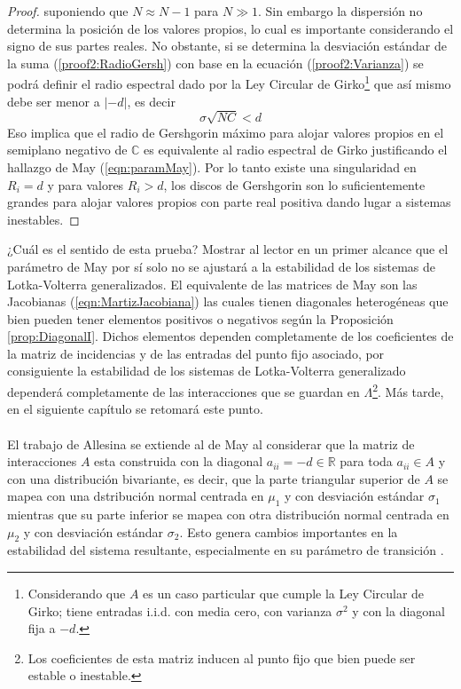 \begin{proposición}
\begin{proof}
		suponiendo que $N\approx N-1$ para $N\gg 1$. Sin embargo la dispersión no determina la posición de los valores propios, lo cual es importante considerando el signo de sus partes reales. No obstante, si se determina la desviación estándar de la suma (\ref{proof2:RadioGersh}) con base en la ecuación (\ref{proof2:Varianza}) se podrá definir el radio espectral dado por la Ley Circular de Girko\footnote{Considerando que $A$ es un caso particular que cumple la Ley Circular de Girko; tiene entradas i.i.d. con media cero, con varianza $\sigma^2$ y con la diagonal fija a $-d$.} \cite{girko1985circular} que así mismo debe ser menor a $|-d|$, es decir
		\begin{equation}\label{eqn:radioMayGirko}
			\sigma\sqrt{NC}<d
		\end{equation}
		Eso implica que el radio de Gershgorin máximo para alojar valores propios en el  semiplano negativo de $\mathbb{C}$ es equivalente al radio espectral de Girko justificando el hallazgo de May (\ref{eqn:paramMay}). Por lo tanto existe una singularidad en $R_i=d$ y para valores $R_i>d$, los discos de Gershgorin son lo suficientemente grandes para alojar valores propios con parte real positiva dando lugar a sistemas inestables. 
	\end{proof}
\end{proposición}
¿Cuál es el sentido de esta prueba? Mostrar al lector en un primer alcance que el parámetro de May por sí solo no se ajustará a la estabilidad de los sistemas de Lotka-Volterra generalizados. El equivalente de las matrices de May son las Jacobianas (\ref{eqn:MartizJacobiana}) las cuales tienen diagonales heterogéneas que bien pueden tener elementos positivos o negativos según la Proposición \ref{prop:DiagonalI}. Dichos elementos dependen completamente de los coeficientes de la matriz de incidencias y de las entradas del punto fijo asociado, por consiguiente la estabilidad de los sistemas de Lotka-Volterra generalizado dependerá completamente de las interacciones que se guardan en $\Lambda$\footnote{Los coeficientes de esta matriz inducen al punto fijo que bien puede ser estable o inestable.}. Más tarde, en el siguiente capítulo se retomará este punto.\\
\\
El trabajo de Allesina se extiende al de May al considerar que la matriz de interacciones $A$ esta construida con la diagonal $a_{ii}=-d\in\mathbb{R}$ para toda $a_{ii}\in A$ y con una distribución bivariante, es decir, que la parte triangular superior de $A$ se mapea con una dstribución normal centrada en $\mu_1$ y con desviación estándar $\sigma_1$ mientras que su parte inferior se mapea con otra distribución normal centrada en $\mu_2$ y con desviación estándar $\sigma_2$. Esto genera cambios importantes en la estabilidad del sistema resultante, especialmente en su parámetro de transición \cite{allesina2012stability, may1972will}.

